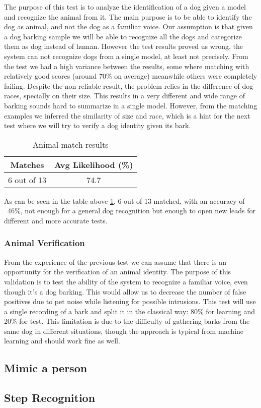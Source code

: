 The purpose of this test is to analyze the identification of a dog given a model
and recognize the animal from it. The main purpose is to be able to identify
the dog as animal, and not the dog as a familiar voice. Our assumption is that
given a dog barking sample we will be able to recognize all the dogs and categorize
them as dog instead of human. \newline
However the test results proved us wrong, the system can not recognize dogs from a single
model, at least not precisely. From the test we had a high variance between the results, some
where matching with relatively good scores (around 70\% on average) meanwhile others
were completely failing. Despite the non reliable result, the problem relies in the
difference of dog races, specially on their size. This results in a very different
and wide range of barking sounds hard to summarize in a single model. However, from
the matching examples we inferred the similarity of size and race, which is a hint for
the next test where we will try to verify a dog identity given its bark.

\begin{table}
    \label{tab:animalres}
\centering
\caption{Animal match results}
\begin{tabular}{|c|c|} \hline
    \textbf{Matches} & \textbf{Avg Likelihood (\%)} \\ \hline
    6 out of 13 & 74.7 \\ \hline
\end{tabular}
\end{table}

As can be seen in the table above \ref{tab:animalres}, 6 out of 13 matched, with an accuracy of
~46\%, not enough for a general dog recognition but enough to open new leads for different and more
accurate tests.

\subsubsection{Animal Verification}

From the experience of the previous test we can assume that there is an opportunity
for the verification of an animal identity. The purpose of this validation is to
test the ability of the system to recognize a familiar voice, even though it's a dog
barking. This would allow us to decrease the number of false positives due to pet
noise while listening for possible intrusions. \newline
This test will use a single recording of a bark and split it in the classical way: 80\%
for learning and 20\% for test. This limitation is due to the difficulty of gathering
barks from the same dog in different situations, though the approach is typical from
machine learning and should work fine as well.












\subsection{Mimic a person}

\subsection{Step Recognition}
